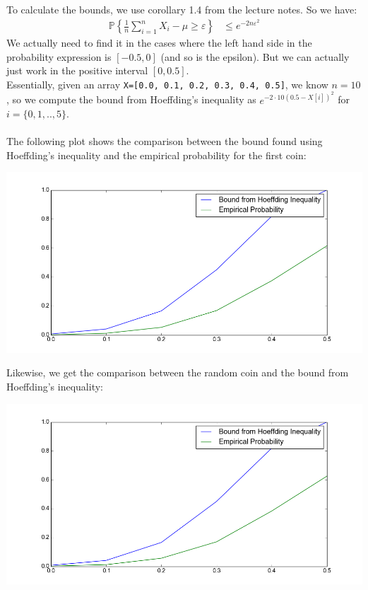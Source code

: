 \documentclass[a4paper]{article}
\begin{document}
\subsection{}
To calculate the bounds, we use corollary 1.4 from the lecture notes. So we have:
\begin{align*}
\mathbb{P} \left \{ \frac{1}{n}\sum_{i=1}^nX_i-\mu \geq \varepsilon\right\} &\leq e^{-2n\varepsilon^2}
\end{align*}
We actually need to find it in the cases where the left hand side in the probability expression is $[-0.5, 0]$ (and so is the epsilon). But we can actually just work in the positive interval $[0, 0.5]$. \\
Essentially, given an array \texttt{X=[0.0, 0.1, 0.2, 0.3, 0.4, 0.5]}, we know $n=10$, so we compute the bound from Hoeffding's inequality as $e^{-2\cdot 10(0.5-X[i])^2}$ for $i=\{0, 1, .., 5\}$. \\
\\
The following plot shows the comparison between the bound found using Hoeffding's inequality and the empirical probability for the first coin:
\begin{center}
	\includegraphics[scale=0.5]{hoef1}
\end{center}
Likewise, we get the comparison between the random coin and the bound from Hoeffding's inequality:
\begin{center}
	\includegraphics[scale=0.5]{hoef2}
\end{center}
\end{document}
